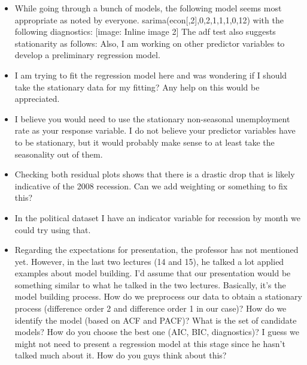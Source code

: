 {\begin{itemize}
  Models 1 and 2 have similar results. Model 1 seems to perform better at the first few lags, but Model 2 does better after lag 15. Model 3 clearly perform better than the two models on the Q-statistic. Since the Model 3 is based on a reasoning our professor does not like, we may not present this model. However it at least informs us that some models based on the thought that both the ACF and PACF cuts off at certain lags might model our data better. 
  
 \item  While going through a bunch of models, the following model seems most appropriate as noted by everyone. sarima(econ[,2],0,2,1,1,1,0,12) with the following diagnostics: [image: Inline image 2] The adf test also suggests stationarity as follows:  Also, I am working on other predictor variables to develop a preliminary regression model.
  
 \item  I am trying to fit the regression model here and was wondering if I should
take the stationary data for my fitting? Any help on this would be
appreciated.

\item I believe you would need to use the stationary non-seasonal unemployment rate as your response variable. I do not believe your predictor variables have to be stationary, but it would probably make sense to at least take the seasonality out of them.

\item Checking both residual plots shows that there is a drastic drop that is likely indicative of the 2008 recession. Can we add weighting or something to fix this?

\item In the political dataset I have an indicator variable for recession by month we could try using that. 

\item Regarding the expectations for presentation, the professor has not mentioned yet. However, in the last two lectures (14 and 15), he talked a lot applied examples about model building. I'd assume that our presentation would be something similar to what he talked in the two lectures. Basically, it's the model building process. How do we preprocess our data to obtain a stationary process (difference order 2 and difference order 1 in our case)? How do we identify the model (based on ACF and PACF)? What is the set of candidate models? How do you choose the best one (AIC, BIC, diagnostics)? I guess we might not need to present a regression model at this stage since he hasn't talked much about it. How do you guys think about this?


\end{itemize}}
